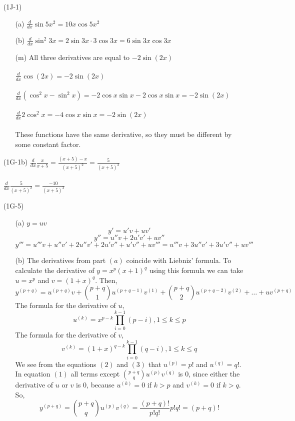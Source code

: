 \documentclass{article}
\begin{document}
\begin{itemize}
\item[(1J-1)]
\begin{itemize}
    \item[(a)] $\frac{d}{dx} \sin{5x^2} = 10x \cos{5x^2}$
    \item[(b)] $\frac{d}{dx} \sin^2{3x} = 2 \sin{3x} \cdot 3 \cos{3x} = 6 \sin{3x} \cos{3x}$ 
    \item[(m)] All three derivatives are equal to $-2 \sin(2x)$ \\
    \\$\frac{d}{dx} \cos(2x) = -2\sin(2x)$ \\
    \\$\frac{d}{dx} (\cos^2x - \sin^2x) = -2 \cos x \sin x - 2 \cos x \sin x = -2 \sin(2x)$ \\
    \\$\frac{d}{dx} 2 \cos^2{x} = -4 \cos{x} \sin{x} = -2 \sin(2x)$ \\
    \\ These functions have the same derivative, so they must be different by some constant factor.
\end{itemize}

\item[(1G-1b)] $\frac{d}{dx} \frac{x}{x+5} = \frac{(x+5)-x}{(x+5)^2} = \frac{5}{(x+5)^2}$ \\ \\
$\frac{d}{dx} \frac{5}{(x+5)^2} = \frac{-10}{(x+5)^3}$

\item[(1G-5)]
\begin{itemize}
    \item[(a)] $y = uv$
    \[ y' =  u'v + uv'\]
    \[y'' = u''v + 2u'v' + uv''\]
    \[ y''' = u'''v + u''v' + 2u''v' + 2u'v'' + u'v'' + uv''' =   u'''v + 3u''v'+3u'v'' + uv'''\]

    \item[(b)] The derivatives from part $(a)$ coincide with Liebniz' formula. To calculate the derivative of $y = x^p(x+1)^q$ using this formula we can take $u = x^p$ and $v = (1+x)^q$. Then,
    \begin{equation}
        y^{(p+q)} = u^{(p+q)}v + \binom{p+q}{1}u^{(p+q-1)}v^{(1)} + \binom{p+q}{2}u^{(p+q-2)}v^{(2)} + \dots + uv^{(p+q)}
    \end{equation}
    The formula for the derivative of $u$,
    \begin{equation}
        u^{(k)} = x^{p-k} \prod_{i=0}^{k-1}(p-i), 1 \leq k \leq p
    \end{equation}
    The formula for the derivative of $v$,
    \begin{equation}
        v^{(k)} = (1+x)^{q-k} \prod_{i=0}^{k-1}(q-i), 1 \leq k \leq q
    \end{equation}
    We see from the equations $(2)$ and $(3)$ that $u^{(p)} = p!$ and $u^{(q)} = q!$. In equation $(1)$ all terms except $\binom{p+q}{q}u^{(p)}v^{(q)}$ is $0$, since either the derivative of $u$ or $v$ is $0$, because $u^{(k)} = 0$ if $k > p$ and $v^{(k)} = 0$ if $k > q$. So,
    \[ y^{(p+q)} = \binom{p+q}{q}u^{(p)}v^{(q)} = \frac{(p+q)!}{p!q!}p!q! = (p+q)! \]
    \end{itemize}
\end{itemize}
\end{document}

